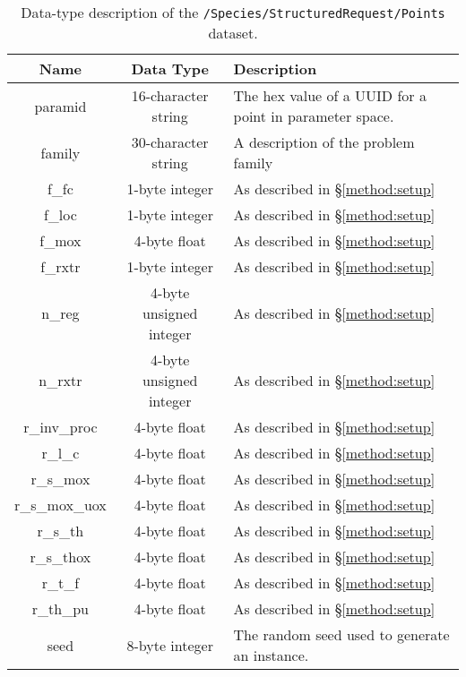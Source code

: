 \begin{table}[h!]
\centering
\caption{\label{tbl:/Species/StructuredRequest/Points}
Data-type description of the \lstinline[basicstyle=\ttfamily\color{black}]|/Species/StructuredRequest/Points| dataset.}
\begin{tabularx}{\columnwidth-10pt}{|c|c|X|} %
\hline
\textbf{Name} & \textbf{Data Type} & \textbf{Description}       \\ \hline
paramid & 16-character string & The hex value of a UUID for a point in parameter space. \\ \hline
family & 30-character string & A description of the problem family \\ \hline
f\_fc & 1-byte integer & As described in \S \ref{method:setup} \\ \hline
f\_loc & 1-byte integer & As described in \S \ref{method:setup} \\ \hline
f\_mox & 4-byte float & As described in \S \ref{method:setup} \\ \hline
f\_rxtr & 1-byte integer & As described in \S \ref{method:setup} \\ \hline
n\_reg & 4-byte unsigned integer & As described in \S \ref{method:setup} \\ \hline
n\_rxtr & 4-byte unsigned integer & As described in \S \ref{method:setup} \\ \hline
r\_inv\_proc & 4-byte float & As described in \S \ref{method:setup} \\ \hline
r\_l\_c & 4-byte float & As described in \S \ref{method:setup} \\ \hline
r\_s\_mox & 4-byte float & As described in \S \ref{method:setup} \\ \hline
r\_s\_mox\_uox & 4-byte float & As described in \S \ref{method:setup} \\ \hline
r\_s\_th & 4-byte float & As described in \S \ref{method:setup} \\ \hline
r\_s\_thox & 4-byte float & As described in \S \ref{method:setup} \\ \hline
r\_t\_f & 4-byte float & As described in \S \ref{method:setup} \\ \hline
r\_th\_pu & 4-byte float & As described in \S \ref{method:setup} \\ \hline
seed & 8-byte integer & The random seed used to generate an instance. \\ \hline
\end{tabularx}
\end{table}


